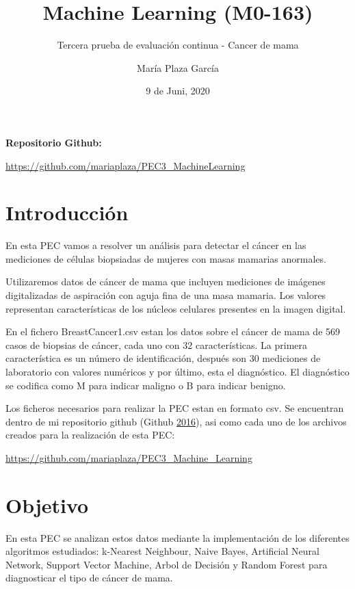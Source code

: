 \documentclass[
]{article}
\title{Machine Learning (M0-163)}
\subtitle{Tercera prueba de evaluación continua - Cancer de mama}
\author{María Plaza García}
\date{9 de Juni, 2020}
\begin{document}
\maketitle

{
\hypersetup{linkcolor=}
\setcounter{tocdepth}{3}
\tableofcontents
}
\textbf{Repositorio Github:}

\url{https://github.com/mariaplaza/PEC3_MachineLearning}

\pagebreak

\hypertarget{introducciuxf3n}{%
\section{Introducción}\label{introducciuxf3n}}

En esta PEC vamos a resolver un análisis para detectar el cáncer en las
mediciones de células biopsiadas de mujeres con masas mamarias
anormales.

Utilizaremos datos de cáncer de mama que incluyen mediciones de imágenes
digitalizadas de aspiración con aguja fina de una masa mamaria. Los
valores representan características de los núcleos celulares presentes
en la imagen digital.

En el fichero BreastCancer1.csv estan los datos sobre el cáncer de mama
de 569 casos de biopsias de cáncer, cada uno con 32 características. La
primera característica es un número de identificación, después son 30
mediciones de laboratorio con valores numéricos y por último, esta el
diagnóstico. El diagnóstico se codifica como M para indicar maligno o B
para indicar benigno.

Los ficheros necesarios para realizar la PEC estan en formato csv. Se
encuentran dentro de mi repositorio github (Github
\protect\hyperlink{ref-github2016github}{2016}), asi como cada uno de
los archivos creados para la realización de esta PEC:

\url{https://github.com/mariaplaza/PEC3_Machine_Learning}

\hypertarget{objetivo}{%
\section{Objetivo}\label{objetivo}}

En esta PEC se analizan estos datos mediante la implementación de los
diferentes algoritmos estudiados: k-Nearest Neighbour, Naive Bayes,
Artificial Neural Network, Support Vector Machine, Arbol de Decisión y
Random Forest para diagnosticar el tipo de cáncer de mama.
\end{document}
